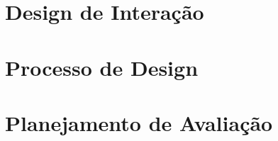 









\frenchspacing 
\imprimircapa
\imprimirfolhaderosto*





\textual




\part[Design de Interação]{Design de Interação}




\part[Processo de Design]{Processo de Design}



\part[Planejamento de Avaliação]{Planejamento de Avaliação}











\postextual
 
\printindex



